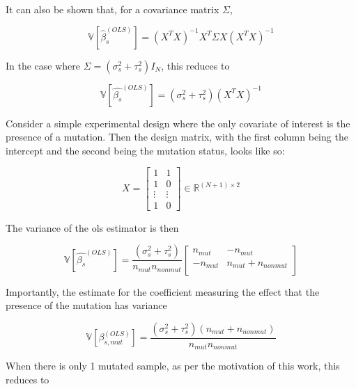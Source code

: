 It can also be shown that, for a covariance matrix $\Sigma$,

\begin{equation*}
  \mathbb{V} \left[ \hat{\beta}_s^{(OLS)} \right] = (X^TX)^{-1} X^T \Sigma X (X^TX)^{-1}
\end{equation*}

In the case where $\Sigma = (\sigma_s^2 + \tau_s^2)I_N$, this reduces to

\begin{equation*}
  \mathbb{V} \left[ \hat{\beta_s}^{(OLS)} \right] = (\sigma_s^2 + \tau_s^2)(X^TX)^{-1}
\end{equation*}

Consider a simple experimental design where the only covariate of interest is the presence of a mutation.
Then the design matrix, with the first column being the intercept and the second being the mutation status, looks like so:

\begin{equation*}
  X = \begin{bmatrix}
  1 & 1 \\
  1 & 0 \\
  \vdots & \vdots \\
  1 & 0
  \end{bmatrix}
\in \mathbb{R}^{(N + 1) \times 2}
\end{equation*}

The variance of the \gls{ols} estimator is then

\begin{equation*}
  \mathbb{V} \left[ \hat{\beta_s}^{(OLS)} \right] = \frac{(\sigma_s^2 + \tau_s^2)}{n_{mut} n_{nonmut}}
  \begin{bmatrix}
    n_{mut} & -n_{mut} \\
    - n_{mut} & n_{mut} + n_{nonmut} \\
  \end{bmatrix}
\end{equation*}

Importantly, the estimate for the coefficient measuring the effect that the presence of the mutation has variance

\begin{equation*}
  \mathbb{V} \left[\beta_{s, mut}^{(OLS)} \right] = \frac{(\sigma_s^2 + \tau_s^2)(n_{mut} + n_{nonmut})}{n_{mut} n_{nonmut}}
\end{equation*}

When there is only 1 mutated sample, as per the motivation of this work, this reduces to

